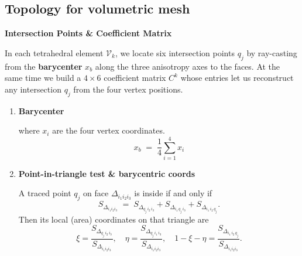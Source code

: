 \documentclass{article}
\begin{document}
\subsection{Topology for volumetric mesh}
\textbf{Intersection Points \& Coefficient Matrix}

In each tetrahedral element $\mathcal V_k$, we locate six intersection points $q_{j}$\cite{bourguignon2000anisotropy, lakhal2013modified}
 by ray-casting from the \textbf{barycenter} $x_b$ along the three anisotropy axes to the faces. At the same time we build a $4\times6$ coefficient matrix $C^k$ whose entries let us reconstruct any intersection $q_j$ from the four vertex positions.

\begin{enumerate}
    \item \textbf{Barycenter}
    
    where $x_i$ are the four vertex coordinates.
    \begin{equation}
        x_b \;=\;\frac{1}{4}\sum_{i=1}^4 x_i
        \tag{2.22}
        \label{eq:barycenter}
    \end{equation}

    \item \textbf{Point-in-triangle test \& barycentric coords}
    
    A traced point $q_j$ on face $\Delta_{i_1i_2i_3}$ is inside if and only if
    \begin{equation}
        S_{\Delta_{i_1i_2i_3}} \;=\; S_{\Delta_{q_j\,i_2\,i_3}} + S_{\Delta_{i_1\,q_j\,i_3}} + S_{\Delta_{i_1\,i_2\,q_j}}.
        \tag{2.23}
        \label{eq:point_in_triangle}
    \end{equation}
    Then its local (area) coordinates on that triangle are
    \begin{equation}
        \xi=\frac{S_{\Delta_{q_j\,i_2\,i_3}}}{S_{\Delta_{i_1i_2i_3}}},\quad
        \eta=\frac{S_{\Delta_{q_j\,i_1\,i_3}}}{S_{\Delta_{i_1i_2i_3}}}, \quad
        1-\xi-\eta=\frac{S_{\Delta_{i_1\,i_2\,q_j}}}{S_{\Delta_{i_1i_2i_3}}}.
        \tag{2.24}
        \label{eq:barycentric_coords}
    \end{equation}
    

\end{enumerate}
\end{document}

